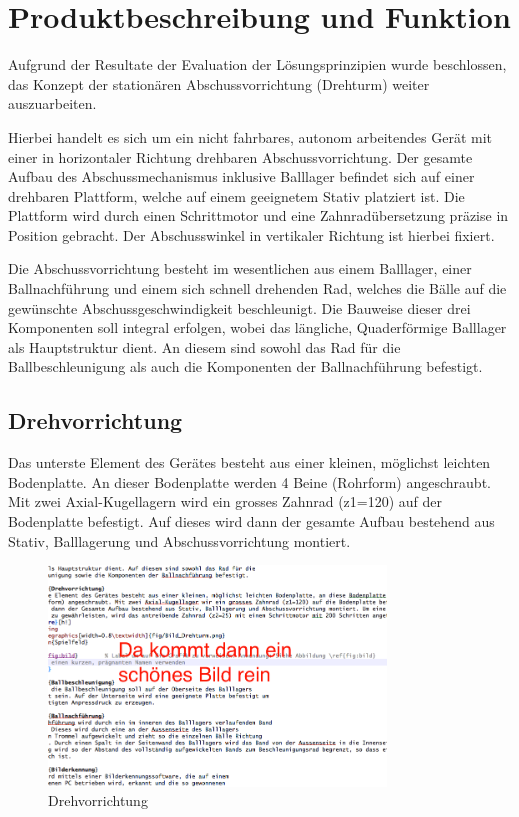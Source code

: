 \section{Produktbeschreibung und Funktion}

Aufgrund der Resultate der Evaluation der Lösungsprinzipien wurde beschlossen, 
das Konzept der stationären Abschussvorrichtung (Drehturm) weiter 
auszuarbeiten. 

Hierbei handelt es sich um ein nicht fahrbares, autonom arbeitendes Gerät mit 
einer in horizontaler Richtung drehbaren Abschussvorrichtung. Der gesamte Aufbau 
des Abschussmechanismus inklusive Balllager befindet sich auf einer drehbaren 
Plattform, welche auf einem geeignetem Stativ platziert ist. Die Plattform 
wird durch einen Schrittmotor und eine Zahnradübersetzung präzise in Position 
gebracht. Der Abschusswinkel in vertikaler Richtung ist hierbei fixiert. 

Die Abschussvorrichtung besteht im wesentlichen aus einem Balllager, einer 
Ballnachführung und einem sich schnell drehenden Rad, welches die Bälle auf 
die gewünschte Abschussgeschwindigkeit beschleunigt. Die Bauweise dieser drei 
Komponenten soll integral erfolgen, wobei das längliche, Quaderförmige 
Balllager als Hauptstruktur dient. An diesem sind sowohl das Rad für die 
Ballbeschleunigung als auch die Komponenten der Ballnachführung befestigt.

\subsection{Drehvorrichtung}
Das unterste Element des Gerätes besteht aus einer kleinen, möglichst leichten 
Bodenplatte. An dieser Bodenplatte werden 4 Beine (Rohrform) angeschraubt. Mit 
zwei Axial-Kugellagern wird ein grosses Zahnrad (z1=120) auf der Bodenplatte 
befestigt. Auf dieses wird dann der gesamte Aufbau bestehend aus Stativ, 
Balllagerung und Abschussvorrichtung montiert. 

\begin{figure}[h!]          
	\centering             
	\includegraphics[width=0.8\textwidth]{fig/Bild_Drehturm.png}    
	\caption{Drehvorrichtung}
	
	\label{fig:bild}        %
\end{figure}

